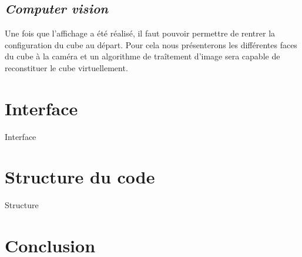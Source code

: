 \documentclass[a4paper]{report}
\begin{document}
\section{\textit{Computer vision}}
Une fois que l'affichage a été réalisé, il faut pouvoir permettre de rentrer la configuration du cube au départ. Pour cela nous présenterons les différentes faces du cube à la caméra et un algorithme de traîtement d'image sera capable de reconstituer le cube virtuellement.

\chapter{Interface}
Interface

\chapter{Structure du code}
Structure

\chapter*{Conclusion}
\end{document}
